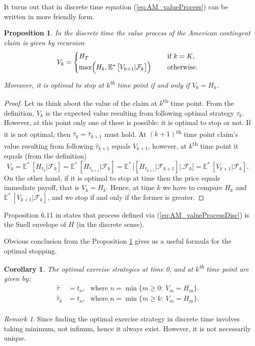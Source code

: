 \documentclass[a4paper,11pt, twoside]{book}
\newtheorem{prop}[thm]{Proposition}
\newtheorem{coro}[thm]{Corollary}
\theoremstyle{definition}
\theoremstyle{remark}
\newtheorem{remark}{Remark}[chapter]
\def\Em{{\mathbb{E}^*}\,}
\begin{document}
It turns out that in discrete time equation (\ref{eq:AM_valueProcess}) can be written in more friendly form.
\begin{prop}
\label{prop:AM_valueProcessDisc}
 In the discrete time the value process of the American contingent claim is given by recursion
 \begin{equation}
  \label{eq:AM_valueProcessDisc}
  V_{k} = \begin{cases}
             H_T &\text{if } k = K,\\
             \max\Bigl(H_{k}, \Em\bigl[ V_{k+1} | \mathcal{F}_{k} \bigr] \Bigl)\ \ \ \ &\text{otherwise.}
            \end{cases}
 \end{equation}
 Moreover, it is optimal to stop at $k$\textsuperscript{th} time point if and only if $V_{k} = H_{k}$. 
\end{prop}
\begin{proof}
Let us think about the value of the claim at $k$\textsuperscript{th} time point. From the definition, $V_{k}$ is the expected value resulting from following optimal strategy $\hat{\tau}_{k}$. However, at this point only one of these is possible: it is optimal to stop or not. If it is not optimal, then $\hat{\tau}_{k} = \hat{\tau}_{k+1}$ must hold. At $(k+1)$\textsuperscript{th} time point claim's value resulting from following $\hat{\tau}_{k+1}$ equals $V_{k+1}$, however, at $k$\textsuperscript{th} time point it equals (from the definition) 
\[ V_{k} = \Em[H_{\hat{\tau}_{k}} | \mathcal{F}_{k}] = \Em[H_{\hat{\tau}_{k+1}} | \mathcal{F}_{k}] = \Em\bigl[[H_{\hat{\tau}_{k+1}} | \mathcal{F}_{k+1}] \bigl|\bigr. \mathcal{F}_{k} \bigr] = \Em[V_{k+1} | \mathcal{F}_{k}].\]
On the other hand, if it is optimal to stop at time then the price equals immediate payoff, that is $V_{k} = H_{k}$. Hence, at time $k$ we have to compare $H_{k}$ and $\Em[V_{k+1} | \mathcal{F}_{k}]$, and we stop if and only if the former is greater.
\end{proof}
Proposition 6.11 in \cite{follmer} states that process defined via (\ref{eq:AM_valueProcessDisc}) is the Snell envelope of $H$ (in the discrete sense).

Obvious conclusion from the Proposition \ref{prop:AM_valueProcessDisc} gives us a useful formula for the optimal stopping.
\begin{coro}
 \label{coro:AM_optStopDisc}
 The optimal exercise strategies at time 0, and at $k$\textsuperscript{th} time point are given by:
 \begin{equation}
  \label{eq:AM_optStopDisc}
  \begin{split}
   \hat{\tau} &= t_n,\ \ \ \text{where } n = \min\{m \geq 0:\ V_m = H_m \}.\\
   \hat{\tau}_{k} &= t_n,\ \ \ \text{where } n = \min\{m \geq k:\ V_m = H_m \}.\\
  \end{split}
 \end{equation}
\end{coro}
\begin{remark}
 Since finding the optimal exercise strategy in discrete time involves taking minimum, not infinum, hence it always exist. However, it is not necessarily unique.
\end{remark}
\end{document}
